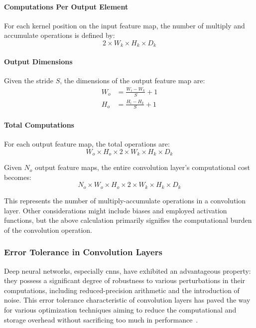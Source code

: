 \paragraph{Computations Per Output Element}

For each kernel position on the input feature map, the number of multiply and accumulate operations is defined by:
\begin{equation}
2 \times W_k \times H_k \times D_k
\end{equation}

\paragraph{Output Dimensions}

Given the stride \( S \), the dimensions of the output feature map are:
\begin{align}
W_o &= \frac{W_i - W_k}{S} + 1 \\
H_o &= \frac{H_i - H_k}{S} + 1
\end{align}

\paragraph{Total Computations}

For each output feature map, the total operations are:
\begin{equation}
W_o \times H_o \times 2 \times W_k \times H_k \times D_k
\end{equation}

Given \( N_o \) output feature maps, the entire convolution layer's computational cost becomes:
\begin{equation}
N_o \times W_o \times H_o \times 2 \times W_k \times H_k \times D_k
\end{equation}

This represents the number of multiply-accumulate operations in a convolution layer. Other considerations might include biases and employed activation functions, but the above calculation primarily signifies the computational burden of the convolution operation.

\subsubsection{Error Tolerance in Convolution Layers}

Deep neural networks, especially \glspl{cnn}, have exhibited an advantageous property: they possess a significant degree of robustness to various perturbations in their computations, including reduced-precision arithmetic and the introduction of noise. This error tolerance characteristic of convolution layers has paved the way for various optimization techniques aiming to reduce the computational and storage overhead without sacrificing too much in performance~\cite{han2015deep}.

